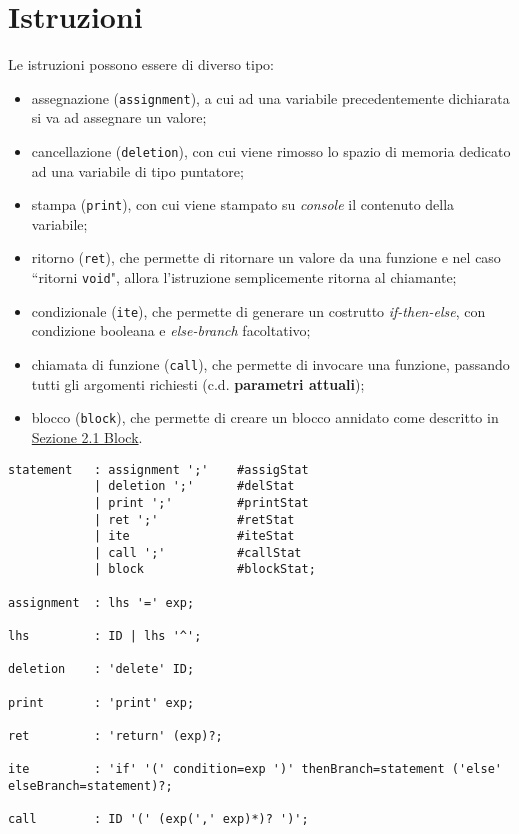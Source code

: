 \documentclass[../report.tex]{subfiles}
\begin{document}
\section{Istruzioni}\label{s:istruzioni}
Le istruzioni possono essere di diverso tipo:
\begin{itemize}
    \item assegnazione (\verb|assignment|), a cui ad una variabile precedentemente dichiarata si va ad assegnare un valore;
    \item cancellazione (\verb|deletion|), con cui viene rimosso lo spazio di memoria dedicato ad una variabile di tipo puntatore;
    \item stampa (\verb|print|), con cui viene stampato su \textit{console} il contenuto della variabile;
    \item ritorno (\verb|ret|), che permette di ritornare un valore da una funzione e nel caso ``ritorni \verb|void|", allora l'istruzione semplicemente ritorna al chiamante;
    \item condizionale (\verb|ite|), che permette di generare un costrutto \textit{if-then-else}, con condizione booleana e \textit{else-branch} facoltativo;
    \item chiamata di funzione (\verb|call|), che permette di invocare una funzione, passando tutti gli argomenti richiesti (c.d. \textbf{parametri attuali});
    \item blocco (\verb|block|), che permette di creare un blocco annidato come descritto in \hyperref[s:block]{Sezione 2.1 Block}.
\end{itemize}
\begin{lstlisting}[style=antlr]
statement   : assignment ';'    #assigStat
            | deletion ';'      #delStat
            | print ';'         #printStat
            | ret ';'           #retStat
            | ite               #iteStat
            | call ';'          #callStat
            | block             #blockStat;

assignment  : lhs '=' exp;

lhs         : ID | lhs '^';

deletion    : 'delete' ID;

print       : 'print' exp;

ret         : 'return' (exp)?;

ite         : 'if' '(' condition=exp ')' thenBranch=statement ('else' elseBranch=statement)?;

call        : ID '(' (exp(',' exp)*)? ')';
\end{lstlisting}
\end{document}
